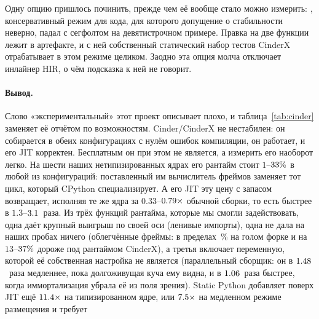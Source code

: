 Одну опцию пришлось починить, прежде чем её вообще стало можно измерить:
, консервативный режим для кода, для которого допущение о
стабильности неверно, падал с сегфолтом на девятистрочном примере. Правка на две функции лежит в
артефакте, и с ней собственный статический набор тестов CinderX отрабатывает в этом режиме
целиком. Заодно эта опция молча отключает инлайнер HIR, о чём подсказка к ней не говорит.

\paragraph{Вывод.} Слово «экспериментальный» этот проект описывает плохо, и
таблица~\ref{tab:cinder} заменяет её отчётом по возможностям. Cinder/CinderX не нестабилен: он
собирается в обеих конфигурациях с нулём ошибок компиляции, он работает, и его JIT
корректен. Бесплатным он при этом не является, а измерить его наоборот легко. На шести наших нетипизированных ядрах его рантайм стоит $1$--$\meas{pct:b6_cinderx-fork_cinderx:mandelbrot/fork_cinderx|b6_cinderx-stock:mandelbrot/stock}{33}\%$ в любой
из конфигураций: поставленный им вычислитель фреймов заменяет тот цикл, который CPython
специализирует. А его JIT эту цену с запасом возвращает, исполняя те же ядра за
$0.33$--$\meas{ratio:b6_cinderx-fork_jit:binarytrees/fork_jit|b6_cinderx-stock:binarytrees/stock}{0.79}\times$ обычной сборки, то есть быстрее в $1.3$--$\meas{ratio:b6_cinderx-stock:mandelbrot/stock|b6_cinderx-fork_jit:mandelbrot/fork_jit}{3.1}$~раза. Из трёх
функций рантайма, которые мы смогли задействовать, одна даёт крупный выигрыш по своей оси (ленивые
импорты), одна не дала на наших пробах ничего (облегчённые фреймы: в пределах \,\% на голом форке и
на $13$--$\meas{pct:b6_cinderx-fork_cinderx:call_depth_200/fork_cinderx|b6_cinderx-stock:call_depth_200/stock}{37}\%$ дороже под рантаймом CinderX), а третья включает переменную, которой её собственная
настройка не является (параллельный сборщик: он в $\meas{ratio:b6_gcscale-fork_cinderx:gc_collect/fork_cinderx/state_visible_par6|b6_gcscale-fork_cinderx:gc_collect/fork_cinderx/state_visible_serial}{1.48}$~раза медленнее, пока долгоживущая куча
ему видна, и в $\meas{ratio:b6_gcscale-fork_cinderx:gc_collect/fork_cinderx/immortal_serial|b6_gcscale-fork_cinderx:gc_collect/fork_cinderx/immortal_par6}{1.06}$~раза быстрее, когда иммортализация убрала её из поля зрения). Static Python добавляет поверх JIT ещё $\meas{ratio:b6_static-fork_static:matmul96_int/fork_static/boxed_jit|b6_static-fork_static_adaptive:matmul96_int/fork_static_adaptive/static_jit}{11.4}\times$ на типизированном ядре, или $\meas{ratio:b6_static-fork_static:matmul96_int/fork_static/boxed_jit|b6_static-fork_static:matmul96_int/fork_static/static_jit}{7.5}\times$ на медленном режиме размещения и требует
